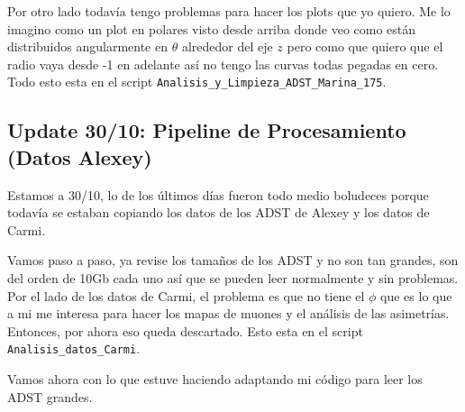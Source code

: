 Por otro lado todavía tengo problemas para hacer los plots que yo quiero. Me lo imagino como un plot en polares visto desde arriba donde veo como están distribuidos angularmente en $\theta$ alrededor del eje $z$ pero como que quiero que el radio vaya desde -1 en adelante así no tengo las curvas todas pegadas en cero. Todo esto esta en el script \lstinline|Analisis_y_Limpieza_ADST_Marina_175|.

\subsection*{Update 30/10: Pipeline de Procesamiento (Datos Alexey)}

Estamos a 30/10, lo de los últimos días fueron todo medio boludeces porque todavía se estaban copiando los datos de los ADST de Alexey y los datos de Carmi. 

Vamos paso a paso, ya revise los tamaños de los ADST y no son tan grandes, son del orden de 10Gb cada uno así que se pueden leer normalmente y sin problemas. Por el lado de los datos de Carmi, el problema es que no tiene el $\phi$ que es lo que a mi me interesa para hacer los mapas de muones y el análisis de las asimetrías. Entonces, por ahora eso queda descartado. Esto esta en el script \lstinline|Analisis_datos_Carmi|. 

Vamos ahora con lo que estuve haciendo adaptando mi código para leer los ADST grandes.

